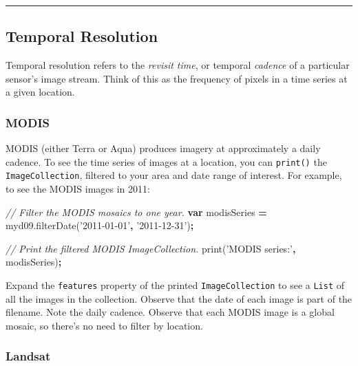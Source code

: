 \documentclass[
]{article}
\newenvironment{Shaded}{\begin{snugshade}}{\end{snugshade}}
\newcommand{\AttributeTok}[1]{\textcolor[rgb]{0.77,0.63,0.00}{#1}}
\newcommand{\CommentTok}[1]{\textcolor[rgb]{0.56,0.35,0.01}{\textit{#1}}}
\newcommand{\KeywordTok}[1]{\textcolor[rgb]{0.13,0.29,0.53}{\textbf{#1}}}
\newcommand{\NormalTok}[1]{#1}
\newcommand{\OperatorTok}[1]{\textcolor[rgb]{0.81,0.36,0.00}{\textbf{#1}}}
\newcommand{\StringTok}[1]{\textcolor[rgb]{0.31,0.60,0.02}{#1}}
\newcommand{\VariableTok}[1]{\textcolor[rgb]{0.00,0.00,0.00}{#1}}
\begin{document}
\begin{center}\rule{0.5\linewidth}{0.5pt}\end{center}

\hypertarget{temporal-resolution}{%
\subsection{Temporal Resolution}\label{temporal-resolution}}

Temporal resolution refers to the \emph{revisit time}, or temporal \emph{cadence} of a particular sensor's image stream. Think of this as the frequency of pixels in a time series at a given location.

\hypertarget{modis-1}{%
\subsubsection{MODIS}\label{modis-1}}

MODIS (either Terra or Aqua) produces imagery at approximately a daily cadence. To see the time series of images at a location, you can \texttt{print()} the \texttt{ImageCollection}, filtered to your area and date range of interest. For example, to see the MODIS images in 2011:

\begin{Shaded}
\begin{Highlighting}[]
\CommentTok{// Filter the MODIS mosaics to one year.   }
\KeywordTok{var}\NormalTok{ modisSeries }\OperatorTok{=} \VariableTok{myd09}\NormalTok{.}\AttributeTok{filterDate}\NormalTok{(}\StringTok{'2011-01-01'}\OperatorTok{,} \StringTok{'2011-12-31'}\NormalTok{)}\OperatorTok{;}      

\CommentTok{// Print the filtered  MODIS ImageCollection.   }
\AttributeTok{print}\NormalTok{(}\StringTok{'MODIS series:'}\OperatorTok{,}\NormalTok{ modisSeries)}\OperatorTok{;}  
\end{Highlighting}
\end{Shaded}

Expand the \texttt{features} property of the printed \texttt{ImageCollection} to see a \texttt{List} of all the images in the collection. Observe that the date of each image is part of the filename. Note the daily cadence. Observe that each MODIS image is a global mosaic, so there's no need to filter by location.

\hypertarget{landsat}{%
\subsubsection{Landsat}\label{landsat}}
\end{document}
